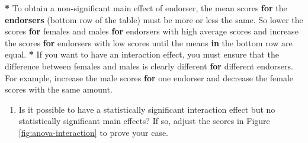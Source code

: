 \documentclass[a4paper]{book}
\newenvironment{Shaded}{\begin{snugshade}}{\end{snugshade}}
\newcommand{\KeywordTok}[1]{\textcolor[rgb]{0,0,0}{\textbf{#1}}}
\newcommand{\StringTok}[1]{\textcolor[rgb]{0.00,0.00,0.00}{#1}}
\newcommand{\ControlFlowTok}[1]{\textcolor[rgb]{0.00,0.00,0.00}{\textbf{#1}}}
\newcommand{\OperatorTok}[1]{\textcolor[rgb]{0.00,0.00,0.00}{\textbf{#1}}}
\newcommand{\NormalTok}[1]{#1}
\providecommand{\tightlist}{%
  \setlength{\itemsep}{0pt}\setlength{\parskip}{0pt}}
\theoremstyle{definition}
\theoremstyle{definition}
\theoremstyle{definition}
\theoremstyle{remark}
\begin{document}
\begin{Shaded}
\begin{Highlighting}[]
\OperatorTok{*}\StringTok{ }\NormalTok{To obtain a non}\OperatorTok{-}\NormalTok{significant main effect of endorser, the mean scores }\ControlFlowTok{for}\NormalTok{ the}
\KeywordTok{endorsers}\NormalTok{ (bottom row of the table) must be more or less the same. So lower}
\NormalTok{the scores }\ControlFlowTok{for}\NormalTok{ females and males }\ControlFlowTok{for}\NormalTok{ endorsers with high average scores and}
\NormalTok{increase the scores }\ControlFlowTok{for}\NormalTok{ endorsers with low scores until the means }\ControlFlowTok{in}\NormalTok{ the}
\NormalTok{bottom row are equal.}
\OperatorTok{*}\StringTok{ }\NormalTok{If you want to have an interaction effect, you must ensure that the}
\NormalTok{difference between females and males is clearly different }\ControlFlowTok{for}\NormalTok{ different}
\NormalTok{endorsers. For example, increase the male scores }\ControlFlowTok{for}\NormalTok{ one endorser and decrease}
\NormalTok{the female scores with the same amount.}
\end{Highlighting}
\end{Shaded}

\begin{enumerate}
\def\labelenumi{\arabic{enumi}.}
\setcounter{enumi}{2}
\tightlist
\item
  Is it possible to have a statistically significant interaction effect
  but no statistically significant main effects? If so, adjust the
  scores in Figure \ref{fig:anova-interaction} to prove your case.
\end{enumerate}
\end{document}
